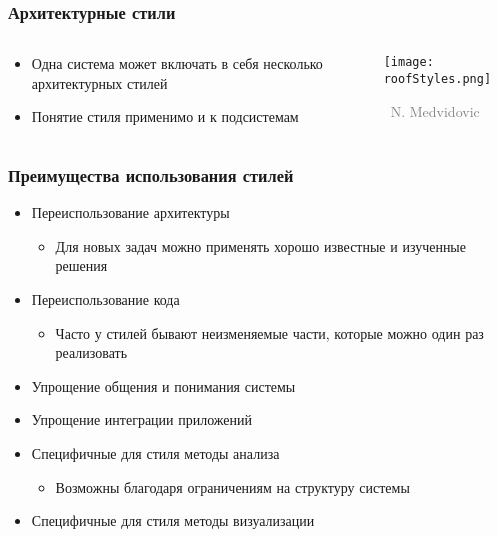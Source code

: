\documentclass[xetex,mathserif,serif]{beamer}
\newcommand{\attribution}[1] {
	\vspace{-5mm}\begin{flushright}\begin{scriptsize}\textcolor{gray}{\textcopyright\, #1}\end{scriptsize}\end{flushright}
}
\begin{document}
	\begin{frame}
		\frametitle{Архитектурные стили}
		\begin{columns}
			\begin{column}{0.5\textwidth}
				\begin{itemize}
					\item Одна система может включать в себя несколько архитектурных стилей
					\item Понятие стиля применимо и к подсистемам
				\end{itemize}
			\end{column}
			\begin{column}{0.5\textwidth}
				\begin{center}
					\texttt{[image: roofStyles.png]}
					\attribution{N. Medvidovic}
				\end{center}
			\end{column}
		\end{columns}
	\end{frame}

	\begin{frame}
		\frametitle{Преимущества использования стилей}
		\begin{itemize}
			\item Переиспользование архитектуры
			\begin{itemize}
				\item Для новых задач можно применять хорошо известные и изученные решения
			\end{itemize}
			\item Переиспользование кода
			\begin{itemize}
				\item Часто у стилей бывают неизменяемые части, которые можно один раз реализовать
			\end{itemize}
			\item Упрощение общения и понимания системы
			\item Упрощение интеграции приложений
			\item Специфичные для стиля методы анализа
			\begin{itemize}
				\item Возможны благодаря ограничениям на структуру системы
			\end{itemize}
			\item Специфичные для стиля методы визуализации
		\end{itemize}
	\end{frame}
\end{document}
